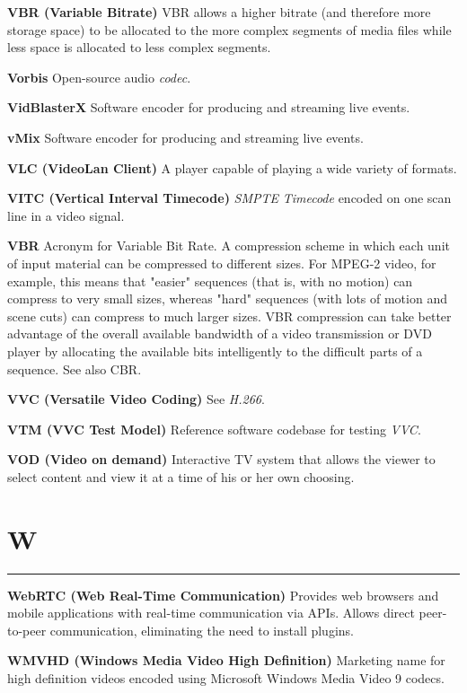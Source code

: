\smallskip
\textbf{VBR (Variable Bitrate)}
VBR allows a higher bitrate (and therefore more storage space) to be allocated to the more complex segments of media files while less space is allocated to less complex segments.

\smallskip
\textbf{Vorbis}
Open-source audio \textit{codec}.

\smallskip
\textbf{VidBlasterX}
Software encoder for producing and streaming live events.

\smallskip
\textbf{vMix}
Software encoder for producing and streaming live events.

\smallskip
\textbf{VLC (VideoLan Client)}
A player capable of playing a wide variety of formats.

\smallskip
\textbf{VITC (Vertical Interval Timecode)}
\textit{SMPTE} \textit{Timecode} encoded on one scan line in a video signal.

\smallskip
\textbf{VBR}
Acronym for Variable Bit Rate. A compression scheme in which each unit of input material can be compressed to different sizes. For MPEG-2 video, for example, this means that "easier" sequences (that is, with no motion) can compress to very small sizes, whereas "hard" sequences (with lots of motion and scene cuts) can compress to much larger sizes. VBR compression can take better advantage of the overall available bandwidth of a video transmission or DVD player by allocating the available bits intelligently to the difficult parts of a sequence. See also CBR.

\smallskip
\textbf{VVC (Versatile Video Coding)}
See \textit{H.266}.

\smallskip
\textbf{VTM (VVC Test Model)}
Reference software codebase for testing \textit{VVC}.

\smallskip
\textbf{VOD (Video on demand)}
Interactive TV system that allows the viewer to select content and view it at a time of his or her own choosing.


\section{W}
\hrule

\medskip
\textbf{WebRTC (Web Real-Time Communication)}
Provides web browsers and mobile applications with real-time communication via APIs. Allows direct peer-to-peer communication, eliminating the need to install plugins.

\smallskip
\textbf{WMVHD (Windows Media Video High Definition)}
Marketing name for high definition videos encoded using Microsoft Windows Media Video 9 codecs.


